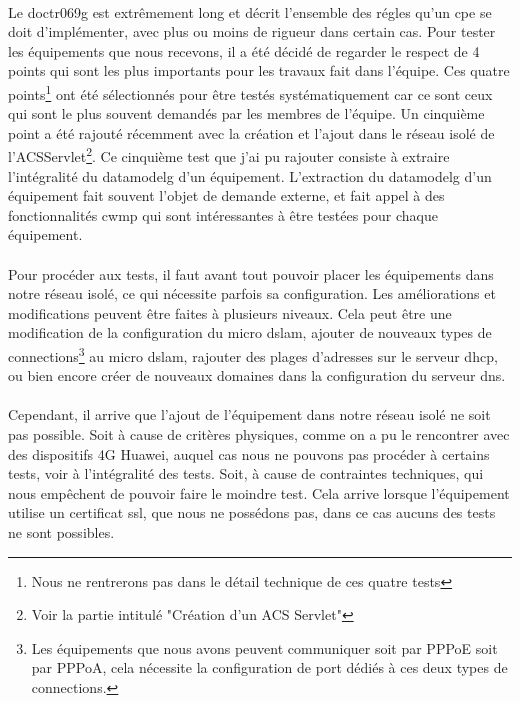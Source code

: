 \documentclass[12pt,a4paper]{report}
\begin{document}
\paragraph*{}Le \gls{doctr069g} est extrêmement long et décrit l'ensemble des régles qu’un \gls{cpe} se doit d'implémenter, avec plus ou moins de rigueur dans certain cas. Pour tester les équipements que nous recevons, il a été décidé de regarder le respect de 4 points qui sont les plus importants pour les travaux fait dans l’équipe. Ces quatre points\footnote{Nous ne rentrerons pas dans le détail technique de ces quatre tests} ont été sélectionnés pour être testés systématiquement car ce sont ceux qui sont le plus souvent demandés par les membres de l’équipe. Un cinquième point a été rajouté récemment avec la création et l’ajout dans le réseau isolé de l’ACSServlet\footnote{Voir la partie intitulé "Création d'un ACS Servlet"}. Ce cinquième test que j’ai pu rajouter consiste à extraire l’intégralité du \gls{datamodelg} d’un équipement. L’extraction du \gls{datamodelg} d’un équipement fait souvent l’objet de demande externe, et fait appel à des fonctionnalités \gls{cwmp} qui sont intéressantes à être testées pour chaque équipement.
\paragraph*{}Pour procéder aux tests, il faut avant tout pouvoir placer les équipements dans notre réseau isolé, ce qui nécessite parfois sa configuration. Les améliorations et modifications peuvent être faites à plusieurs niveaux. Cela peut être une modification de la configuration du micro \gls{dslam}, ajouter de nouveaux types de connections\footnote{Les équipements que nous avons peuvent communiquer soit par PPPoE soit par PPPoA, cela nécessite la configuration de port dédiés à ces deux types de connections.} au micro \gls{dslam}, rajouter des plages d’adresses sur le serveur \gls{dhcp}, ou bien encore créer de nouveaux domaines dans la configuration du serveur \gls{dns}.
\paragraph*{}Cependant, il arrive que l’ajout de l’équipement dans notre réseau isolé ne soit pas possible. Soit à cause de critères physiques, comme on a pu le rencontrer avec des dispositifs 4G Huawei, auquel cas nous ne pouvons pas procéder à certains tests, voir à l’intégralité des tests. Soit, à cause de contraintes techniques, qui nous empêchent de pouvoir faire le moindre test. Cela arrive lorsque l’équipement utilise un certificat \gls{ssl}, que nous ne possédons pas, dans ce cas aucuns des tests ne sont possibles.
\end{document}
